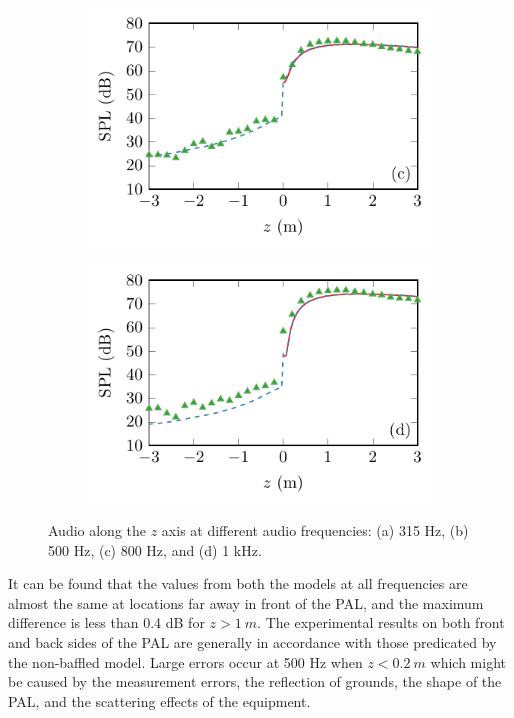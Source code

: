 \begin{figure}[h]
\begin{subfigure}{0.49\textwidth}
        \includegraphics[width = \textwidth]{fig/CompareAxisPrs_800Hz.pdf}
    \end{subfigure}
    \begin{subfigure}{0.49\textwidth}
        \centering
        \includegraphics[width = \textwidth]{fig/CompareAxisPrs_1000Hz.pdf}
    \end{subfigure}
    \caption{Audio  along the $z$ axis at different audio frequencies: (a) 315 Hz, (b) 500 Hz, (c) 800 Hz, and (d) 1 kHz. 
}
    \label{fig:disk:we9f0sd}
\end{figure}

It can be found that the values from both the models at all frequencies are almost the same at locations far away in front of the PAL, and the maximum difference is less than 0.4 dB for $z > \SI{1}{m}$. 
The experimental results on both front and back sides of the PAL are generally in accordance with those predicated by the non-baffled model. 
Large errors occur at 500 Hz when $z < \SI{0.2}{m}$ which might be caused by the measurement errors, the reflection of grounds, the shape of the PAL, and the scattering effects of the equipment.

